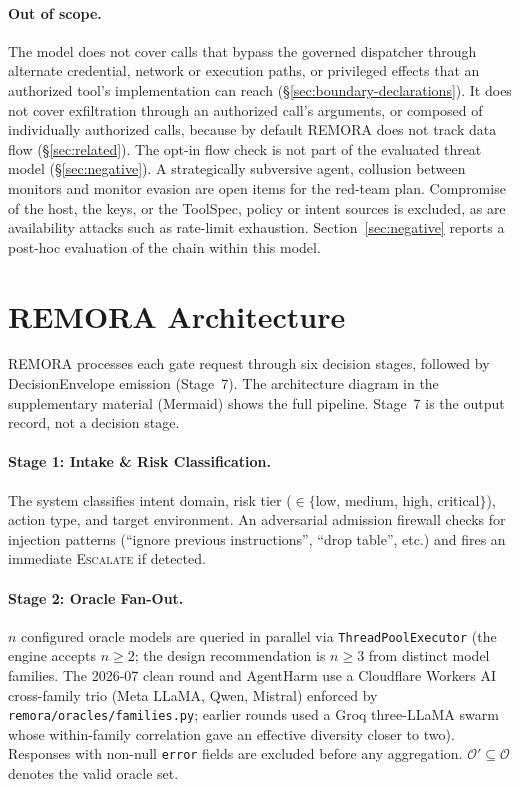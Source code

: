 \documentclass[10pt,twocolumn]{article}
\newcommand{\Oracles}{\mathcal{O}}
\newcommand{\OraclesV}{\mathcal{O}'}
\begin{document}
\paragraph{Out of scope.} The model does not cover calls that bypass the
governed dispatcher through alternate credential, network or execution
paths, or privileged effects that an authorized tool's implementation can
reach (\S\ref{sec:boundary-declarations}). It does not cover exfiltration
through an authorized call's arguments, or composed of individually
authorized calls, because by default REMORA does not track data flow
(\S\ref{sec:related}). The opt-in flow check is not part of the evaluated
threat model (\S\ref{sec:negative}). A strategically subversive agent,
collusion between monitors and monitor evasion are open items for the
red-team plan. Compromise of the host, the keys, or the ToolSpec, policy
or intent sources is excluded, as are availability attacks such as
rate-limit exhaustion. Section~\ref{sec:negative} reports a post-hoc
evaluation of the chain within this model.

\section{REMORA Architecture}
\label{sec:architecture}

REMORA processes each gate request through six decision stages,
followed by DecisionEnvelope emission (Stage~7).
The architecture diagram in the supplementary material (Mermaid) shows
the full pipeline. Stage~7 is the output record, not a decision stage.

\paragraph{Stage 1: Intake \& Risk Classification.}
The system classifies intent domain, risk tier
($\in\{$low, medium, high, critical$\}$), action type, and target
environment. An adversarial admission firewall checks for injection
patterns (``ignore previous instructions'', ``drop table'', etc.) and
fires an immediate \textsc{Escalate} if detected.

\paragraph{Stage 2: Oracle Fan-Out.}
$n$ configured oracle models are queried in parallel
via \texttt{ThreadPoolExecutor} (the engine accepts $n \geq 2$; the
design recommendation is $n \geq 3$ from distinct model families. The
2026-07 clean round and AgentHarm use a Cloudflare Workers AI cross-family
trio (Meta LLaMA, Qwen, Mistral) enforced by
\texttt{remora/oracles/families.py}; earlier rounds used a Groq
three-LLaMA swarm whose within-family correlation gave an effective
diversity closer to two). Responses with
non-null \texttt{error} fields are excluded before any aggregation.
$\OraclesV \subseteq \Oracles$ denotes the valid oracle set.
\end{document}
